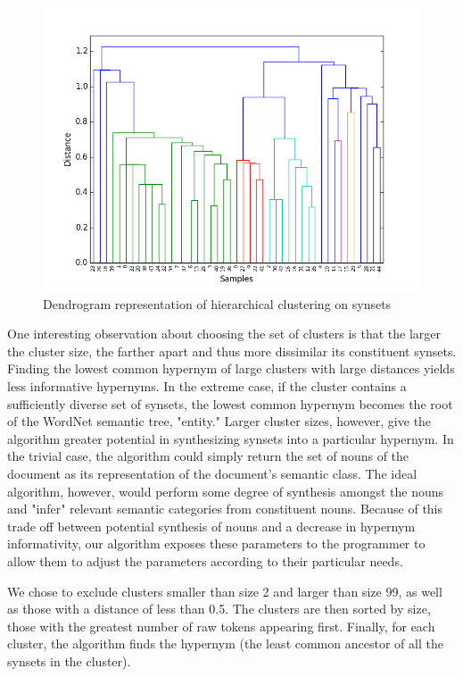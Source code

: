 \documentclass[12pt]{article}
\begin{document}
\begin{figure}[t]
\caption{Dendrogram representation of hierarchical clustering on synsets}
\centering
\includegraphics[width=\textwidth]{hca}
\end{figure}

One interesting observation about choosing the set of clusters is that the larger the cluster size, the farther apart and thus more dissimilar its constituent synsets. Finding the lowest common hypernym of large clusters with large distances yields less informative hypernyms. In the extreme case, if the cluster contains a sufficiently diverse set of synsets, the lowest common hypernym becomes the root of the WordNet semantic tree, "entity." Larger cluster sizes, however, give the algorithm greater potential in synthesizing synsets into a particular hypernym. In the trivial case, the algorithm could simply return the set of nouns of the document as its representation of the document's semantic class. The ideal algorithm, however, would perform some degree of synthesis amongst the nouns and "infer" relevant semantic categories from constituent nouns. Because of this trade off between potential synthesis of nouns and a decrease in hypernym informativity, our algorithm exposes these parameters to the programmer to allow them to adjust the parameters according to their particular needs.

We chose to exclude clusters smaller than size 2 and larger than size 99, as well as those with a distance of less than 0.5. The clusters are then sorted by size, those with the greatest number of raw tokens appearing first. Finally, for each cluster, the algorithm finds the hypernym (the least common ancestor of all the synsets in the cluster).
\end{document}
